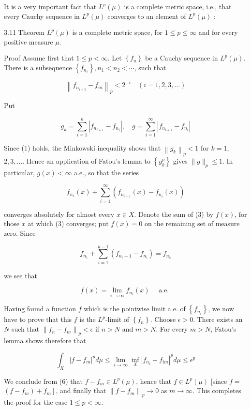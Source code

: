 \documentclass[10pt]{article}
\begin{document}
It is a very important fact that $L^{p}(\mu)$ is a complete metric space, i.e., that every Cauchy sequence in $L^{p}(\mu)$ converges to an element of $L^{p}(\mu)$ :

3.11 Theorem $L^{p}(\mu)$ is a complete metric space, for $1 \leq p \leq \infty$ and for every positive measure $\mu$.

Proof Assume first that $1 \leq p<\infty$. Let $\left\{f_{n}\right\}$ be a Cauchy sequence in $L^{p}(\mu)$. There is a subsequence $\left\{f_{n_{i}}\right\}, n_{1}<n_{2}<\cdots$, such that

$$
\left\|f_{n_{i+1}}-f_{n i}\right\|_{p}<2^{-i} \quad(i=1,2,3, \ldots)
$$

Put

$$
g_{k}=\sum_{i=1}^{k}\left|f_{n_{i+1}}-f_{n_{i}}\right|, \quad g=\sum_{i=1}^{\infty}\left|f_{n_{i+1}}-f_{n_{i}}\right|
$$

Since (1) holds, the Minkowski inequality shows that $\left\|g_{k}\right\|_{p}<1$ for $k=1$, $2,3, \ldots$. Hence an application of Fatou's lemma to $\left\{g_{k}^{p}\right\}$ gives $\|g\|_{p} \leq 1$. In particular, $g(x)<\infty$ a.e., so that the series

$$
f_{n_{1}}(x)+\sum_{i=1}^{\infty}\left(f_{n_{i+1}}(x)-f_{n_{i}}(x)\right)
$$

converges absolutely for almost every $x \in X$. Denote the sum of (3) by $f(x)$, for those $x$ at which (3) converges; put $f(x)=0$ on the remaining set of measure zero. Since

$$
f_{n_{1}}+\sum_{i=1}^{k-1}\left(f_{n_{i}+1}-f_{n_{i}}\right)=f_{n_{k}}
$$

we see that

$$
f(x)=\lim _{i \rightarrow \infty} f_{n_{i}}(x) \quad \text { a.e. }
$$

Having found a function $f$ which is the pointwise limit a.e. of $\left\{f_{n_{i}}\right\}$, we now have to prove that this $f$ is the $L^{p}$-limit of $\left\{f_{n}\right\}$. Choose $\epsilon>0$. There exists an $N$ such that $\left\|f_{n}-f_{m}\right\|_{p}<\epsilon$ if $n>N$ and $m>N$. For every $m>N$, Fatou's lemma shows therefore that

$$
\int_{X}\left|f-f_{m}\right|^{p} d \mu \leq \lim _{i \rightarrow \infty} \inf _{X}\left|f_{n_{i}}-f_{i m}\right|^{p} d \mu \leq \epsilon^{p}
$$

We conclude from (6) that $f-f_{m} \in L^{p}(\mu)$, hence that $f \in L^{p}(\mu)$ [since $f=$ $\left.\left(f-f_{m}\right)+f_{m}\right]$, and finally that $\left\|f-f_{m}\right\|_{p} \rightarrow 0$ as $m \rightarrow \infty$. This completes the proof for the case $1 \leq p<\infty$.
\end{document}
